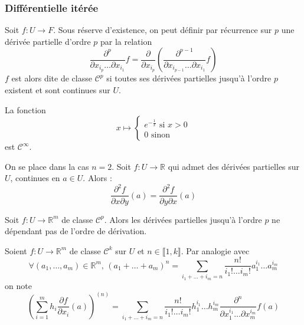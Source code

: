   \subsubsection{Différentielle itérée}

  \begin{definition}
    Soit $f : U \rightarrow F$. Sous réserve d'existence, on peut définir par récurrence sur $p$ une dérivée partielle d'ordre $p$ par la relation
    \[ \frac{\partial^p}{\partial x_{i_p} \dots \partial x_{i_1}} f = \frac{\partial}{\partial x_{i_p}} \left( \frac{\partial^{p-1}}{\partial x_{i_{p-1}} \dots \partial x_{i_1}} f \right) \]
    $f$ est alors dite de classe $\mathcal{C}^p$ si toutes ses dérivées partielles jusqu'à l'ordre $p$ existent et sont continues sur $U$.
  \end{definition}


  \begin{example}
    La fonction
    \[
    x \mapsto \begin{cases}
      e^{-\frac{1}{x}} \text{ si } x > 0 \\
      0 \text{ sinon}
    \end{cases}
    \]
    est $\mathcal{C}^\infty$.
  \end{example}


  \begin{theorem}[Schwarz]
    On se place dans la cas $n = 2$. Soit $f : U \rightarrow \mathbb{R}$ qui admet des dérivées partielles sur $U$, continues en $a \in U$. Alors :
    \[ \frac{\partial^2 f}{\partial x \partial y}(a) = \frac{\partial^2 f}{\partial y \partial x}(a) \]
  \end{theorem}

  \begin{corollary}
    Soit $f : U \rightarrow \mathbb{R}^m$ de classe $\mathcal{C}^p$. Alors les dérivées partielles jusqu'à l'ordre $p$ ne dépendant pas de l'ordre de dérivation.
  \end{corollary}

  \begin{notation}
    Soient $f : U \rightarrow \mathbb{R}^m$ de classe $\mathcal{C}^k$ sur $U$ et $n \in \llbracket 1, k \rrbracket$. Par analogie avec
    \[ \forall (a_1, \dots, a_m) \in \mathbb{R}^m, \, (a_1 + \dots + a_m)^n = \sum_{i_1+\dots+i_m=n} \frac{n!}{i_1! \dots i_m!} a_1^{i_1} \dots a_m^{i_m} \]
    on note
    \[ \left( \sum_{i=1}^m h_i \frac{\partial f}{\partial x_i} (a) \right)^{(n)} = \sum_{i_1+\dots+i_m=n} \frac{n!}{i_1! \dots i_m!} h_1^{i_1} \dots h_m^{i_m} \frac{\partial^n}{\partial x_1^{i_1} \dots \partial x_m^{i_m}} f(a) \]
  \end{notation}

